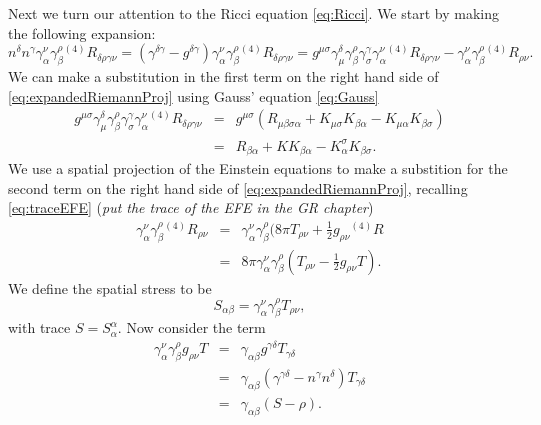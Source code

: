 Next we turn our attention to the Ricci equation \ref{eq:Ricci}. We start by making the following expansion:
\begin{equation}
\label{eq:expandedRiemannProj}
n^\delta n^\gamma \gamma^\nu_\alpha \gamma^\rho_\beta {}^{(4)}R_{\delta \rho \gamma \nu} = (\gamma^{\delta \gamma} - g^{\delta \gamma})\gamma^\nu_\alpha \gamma^\rho_\beta {}^{(4)}R_{\delta \rho \gamma \nu} = g^{\mu \sigma}\gamma^\delta_\mu \gamma^\rho_\beta \gamma^\gamma_\sigma \gamma^\nu_\alpha  {}^{(4)}R_{\delta \rho \gamma \nu} -\gamma^\nu_\alpha \gamma^\rho_\beta {}^{(4)}R_{ \rho  \nu}.
\end{equation}
We can make a substitution in the first term on the right hand side of \ref{eq:expandedRiemannProj} using Gauss' equation \ref{eq:Gauss}
\begin{equation}
\begin{array}{rcl}
\label{eq:GaussRicciSub}
g^{\mu \sigma}\gamma^\delta_\mu \gamma^\rho_\beta \gamma^\gamma_\sigma \gamma^\nu_\alpha  {}^{(4)}R_{\delta \rho \gamma \nu} &=& g^{\mu \sigma}(R_{\mu \beta \sigma \alpha} + K_{\mu \sigma}K_{\beta \alpha} - K_{\mu \alpha}K_{\beta \sigma})\\
 &=& R_{\beta \alpha} + K K_{\beta \alpha}-K^\sigma_\alpha K_{\beta \sigma}.
\end{array}
\end{equation}
We use a spatial projection of the Einstein equations to make a substition for the second term on the right hand side of \ref{eq:expandedRiemannProj}, recalling \ref{eq:traceEFE} (\textit{put the trace of the EFE in the GR chapter})
\begin{equation}
\begin{array}{rcl}
\label{eq:spatialprojectionEFE}
\gamma^\nu_\alpha \gamma^\rho_\beta {}^{(4)}R_{ \rho  \nu} &=& \gamma^\nu_\alpha \gamma^\rho_\beta( 8\pi T_{\rho \nu} + \frac{1}{2}g_{\rho \nu} {}^{(4)}R \\
&=& 8\pi \gamma^\nu_\alpha \gamma^\rho_\beta( T_{\rho \nu} - \frac{1}{2}g_{\rho \nu} T).
\end{array}
\end{equation}
We define the spatial stress to be
\begin{equation}
\label{eq:spatialStress}
S_{\alpha \beta} = \gamma^\nu_\alpha \gamma^\rho_\beta T_{\rho \nu},
\end{equation}
with trace $S=S^\alpha_\alpha$. Now consider the term
\begin{equation}
\label{eq:Sterms}
\begin{array}{rcl}
\gamma^\nu_\alpha \gamma^\rho_\beta g_{\rho \nu} T &=& \gamma_{\alpha \beta} g^{\gamma \delta} T_{\gamma \delta} \\
&=& \gamma_{\alpha \beta}(\gamma^{\gamma \delta}-n^\gamma n^\delta)T_{\gamma \delta} \\
&=& \gamma_{\alpha \beta}(S-\rho).
\end{array}
\end{equation}
